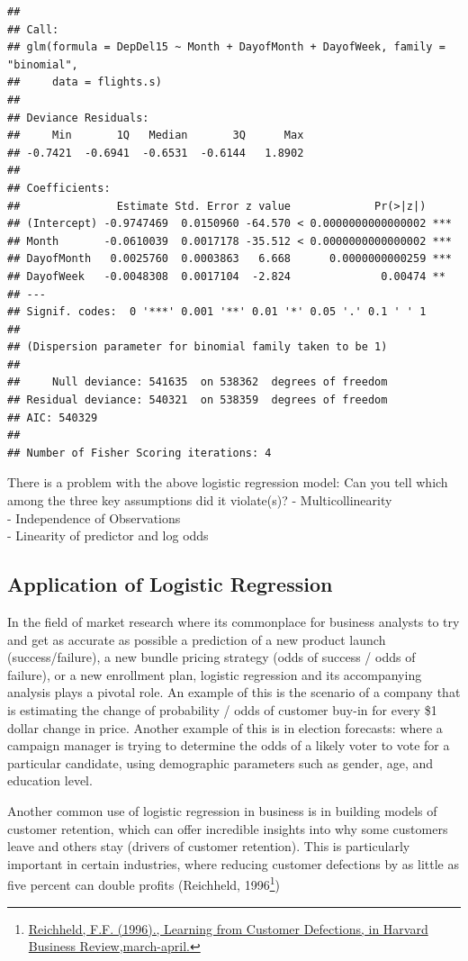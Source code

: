 \documentclass[
]{article}
\begin{document}
\begin{verbatim}
## 
## Call:
## glm(formula = DepDel15 ~ Month + DayofMonth + DayofWeek, family = "binomial", 
##     data = flights.s)
## 
## Deviance Residuals: 
##     Min       1Q   Median       3Q      Max  
## -0.7421  -0.6941  -0.6531  -0.6144   1.8902  
## 
## Coefficients:
##               Estimate Std. Error z value             Pr(>|z|)    
## (Intercept) -0.9747469  0.0150960 -64.570 < 0.0000000000000002 ***
## Month       -0.0610039  0.0017178 -35.512 < 0.0000000000000002 ***
## DayofMonth   0.0025760  0.0003863   6.668      0.0000000000259 ***
## DayofWeek   -0.0048308  0.0017104  -2.824              0.00474 ** 
## ---
## Signif. codes:  0 '***' 0.001 '**' 0.01 '*' 0.05 '.' 0.1 ' ' 1
## 
## (Dispersion parameter for binomial family taken to be 1)
## 
##     Null deviance: 541635  on 538362  degrees of freedom
## Residual deviance: 540321  on 538359  degrees of freedom
## AIC: 540329
## 
## Number of Fisher Scoring iterations: 4
\end{verbatim}

There is a problem with the above logistic regression model: Can you
tell which among the three key assumptions did it violate(s)? -
Multicollinearity\\
- Independence of Observations\\
- Linearity of predictor and log odds

\hypertarget{application-of-logistic-regression}{%
\subsection{Application of Logistic
Regression}\label{application-of-logistic-regression}}

In the field of market research where its commonplace for business
analysts to try and get as accurate as possible a prediction of a new
product launch (success/failure), a new bundle pricing strategy (odds of
success / odds of failure), or a new enrollment plan, logistic
regression and its accompanying analysis plays a pivotal role. An
example of this is the scenario of a company that is estimating the
change of probability / odds of customer buy-in for every \$1 dollar
change in price. Another example of this is in election forecasts: where
a campaign manager is trying to determine the odds of a likely voter to
vote for a particular candidate, using demographic parameters such as
gender, age, and education level.

Another common use of logistic regression in business is in building
models of customer retention, which can offer incredible insights into
why some customers leave and others stay (drivers of customer
retention). This is particularly important in certain industries, where
reducing customer defections by as little as five percent can double
profits (Reichheld, 1996\footnote{\href{}{Reichheld, F.F. (1996).,
  Learning from Customer Defections, in Harvard Business
  Review,march-april.}})
\end{document}
